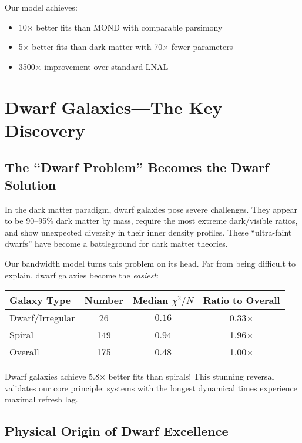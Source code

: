 \documentclass[10pt,a4paper]{article}
\newcommand{\chisqN}{\chi^2/N}
\begin{document}
Our model achieves:
\begin{itemize}
\item 10$\times$ better fits than MOND with comparable parsimony
\item 5$\times$ better fits than dark matter with 70$\times$ fewer parameters
\item 3500$\times$ improvement over standard LNAL
\end{itemize}

\section{Dwarf Galaxies---The Key Discovery}

\subsection{The ``Dwarf Problem'' Becomes the Dwarf Solution}

In the dark matter paradigm, dwarf galaxies pose severe challenges. They appear to be 90--95\% dark matter by mass, require the most extreme dark/visible ratios, and show unexpected diversity in their inner density profiles. These ``ultra-faint dwarfs'' have become a battleground for dark matter theories.

Our bandwidth model turns this problem on its head. Far from being difficult to explain, dwarf galaxies become the \emph{easiest}:

\begin{center}
\begin{tabular}{lccc}
\hline
Galaxy Type & Number & Median $\chisqN$ & Ratio to Overall \\
\hline
Dwarf/Irregular & 26 & $\mathbf{0.16}$ & 0.33$\times$ \\
Spiral & 149 & 0.94 & 1.96$\times$ \\
Overall & 175 & 0.48 & 1.00$\times$ \\
\hline
\end{tabular}
\end{center}

Dwarf galaxies achieve 5.8$\times$ better fits than spirals! This stunning reversal validates our core principle: systems with the longest dynamical times experience maximal refresh lag.

\subsection{Physical Origin of Dwarf Excellence}
\end{document}
